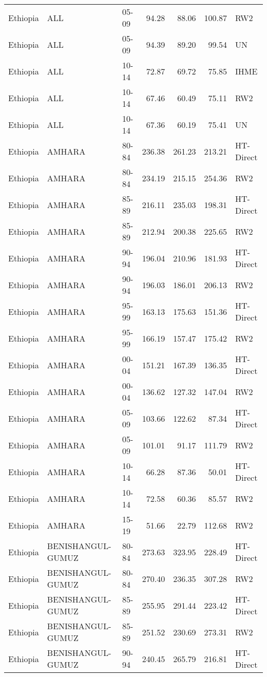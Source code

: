 \begin{longtable}{lllrrrl}
  Ethiopia & ALL & 05-09 & 94.28 & 88.06 & 100.87 & RW2 \\ 
  Ethiopia & ALL & 05-09 & 94.39 & 89.20 & 99.54 & UN \\ 
  Ethiopia & ALL & 10-14 & 72.87 & 69.72 & 75.85 & IHME \\ 
  Ethiopia & ALL & 10-14 & 67.46 & 60.49 & 75.11 & RW2 \\ 
  Ethiopia & ALL & 10-14 & 67.36 & 60.19 & 75.41 & UN \\ 
  Ethiopia & AMHARA & 80-84 & 236.38 & 261.23 & 213.21 & HT-Direct \\ 
  Ethiopia & AMHARA & 80-84 & 234.19 & 215.15 & 254.36 & RW2 \\ 
  Ethiopia & AMHARA & 85-89 & 216.11 & 235.03 & 198.31 & HT-Direct \\ 
  Ethiopia & AMHARA & 85-89 & 212.94 & 200.38 & 225.65 & RW2 \\ 
  Ethiopia & AMHARA & 90-94 & 196.04 & 210.96 & 181.93 & HT-Direct \\ 
  Ethiopia & AMHARA & 90-94 & 196.03 & 186.01 & 206.13 & RW2 \\ 
  Ethiopia & AMHARA & 95-99 & 163.13 & 175.63 & 151.36 & HT-Direct \\ 
  Ethiopia & AMHARA & 95-99 & 166.19 & 157.47 & 175.42 & RW2 \\ 
  Ethiopia & AMHARA & 00-04 & 151.21 & 167.39 & 136.35 & HT-Direct \\ 
  Ethiopia & AMHARA & 00-04 & 136.62 & 127.32 & 147.04 & RW2 \\ 
  Ethiopia & AMHARA & 05-09 & 103.66 & 122.62 & 87.34 & HT-Direct \\ 
  Ethiopia & AMHARA & 05-09 & 101.01 & 91.17 & 111.79 & RW2 \\ 
  Ethiopia & AMHARA & 10-14 & 66.28 & 87.36 & 50.01 & HT-Direct \\ 
  Ethiopia & AMHARA & 10-14 & 72.58 & 60.36 & 85.57 & RW2 \\ 
  Ethiopia & AMHARA & 15-19 & 51.66 & 22.79 & 112.68 & RW2 \\ 
  Ethiopia & BENISHANGUL-GUMUZ & 80-84 & 273.63 & 323.95 & 228.49 & HT-Direct \\ 
  Ethiopia & BENISHANGUL-GUMUZ & 80-84 & 270.40 & 236.35 & 307.28 & RW2 \\ 
  Ethiopia & BENISHANGUL-GUMUZ & 85-89 & 255.95 & 291.44 & 223.42 & HT-Direct \\ 
  Ethiopia & BENISHANGUL-GUMUZ & 85-89 & 251.52 & 230.69 & 273.31 & RW2 \\ 
  Ethiopia & BENISHANGUL-GUMUZ & 90-94 & 240.45 & 265.79 & 216.81 & HT-Direct \\ 

\end{longtable}
